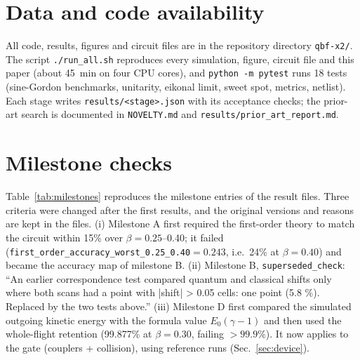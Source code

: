 \documentclass[10pt,twocolumn,letterpaper]{article}
\newcommand{\file}[1]{\texttt{#1}}
\begin{document}
\section*{Data and code availability}
All code, results, figures and circuit files are in the repository directory \file{qbf-x2/\allowbreak{}}. The script
\file{./\allowbreak{}run\_\allowbreak{}all.\allowbreak{}sh} reproduces every simulation, figure, circuit file and this paper (about 45~min on four CPU cores),
and \file{python -m pytest} runs 18 tests (sine-Gordon benchmarks, unitarity, eikonal limit, sweet spot, metrics,
netlist). Each stage writes \file{results/\allowbreak{}<stage>.\allowbreak{}json} with its acceptance checks; the prior-art search is documented
in \file{NOVELTY.\allowbreak{}md} and \file{results/\allowbreak{}prior\_\allowbreak{}art\_\allowbreak{}report.\allowbreak{}md}.

\appendix
\section{Milestone checks}
\label{app:milestones}

Table~\ref{tab:milestones} reproduces the milestone entries of the result files. Three criteria were changed after the
first results, and the original versions and reasons are kept in the files. (i) Milestone A first required the
first-order theory to match the circuit within 15\% over $\beta=0.25$--0.40; it failed
(\file{first\_\allowbreak{}order\_\allowbreak{}accuracy\_\allowbreak{}worst\_\allowbreak{}0.25\_\allowbreak{}0.40}${}=0.243$, i.e.\ 24\% at $\beta=0.40$) and became the accuracy map
of milestone B. (ii) Milestone B, \file{superseded\_\allowbreak{}check}: ``An earlier correspondence test compared quantum and
classical shifts only where both scans had a point with |shift| \textgreater{} 0.05 cells: one point (5.8 \%).
Replaced by the two tests above.'' (iii) Milestone D first compared the simulated outgoing kinetic energy with the
formula value $E_0(\gamma-1)$ and then used the whole-flight retention (99.877\% at $\beta=0.30$, failing
$>99.9$\%). It now applies to the gate (couplers + collision), using reference runs (Sec.~\ref{sec:device}).
\end{document}
